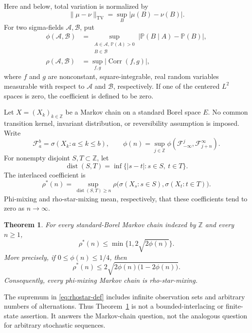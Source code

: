 \documentclass[11pt]{amsart}
\numberwithin{equation}{section}
\newtheorem{theorem}{Theorem}[section]
\theoremstyle{definition}
\newcommand{\PP}{\mathbb P}
\newcommand{\ZZ}{\mathbb Z}
\newcommand{\cF}{\mathcal F}
\newcommand{\TV}{\mathrm{TV}}
\newcommand{\Corr}{\operatorname{Corr}}
\newcommand{\dist}{\operatorname{dist}}
\newcommand{\rhostar}{\rho^{*}}
\begin{document}
Here and below, total variation is normalized by
\begin{equation}\label{eq:tv}
\|\mu-\nu\|_{\TV}=\sup_{B}|\mu(B)-\nu(B)|.
\end{equation}
For two sigma-fields $\mathcal A,\mathcal B$, put
\begin{align}
\phi(\mathcal A,\mathcal B)
 &=\sup_{\substack{A\in\mathcal A,\,\PP(A)>0\\B\in\mathcal B}}
       |\PP(B\mid A)-\PP(B)|,\label{eq:phi-fields}\\
\rho(\mathcal A,\mathcal B)
 &=\sup_{f,g}|\Corr(f,g)|,\label{eq:rho-fields}
\end{align}
where $f$ and $g$ are nonconstant, square-integrable, real random variables measurable with respect to $\mathcal A$ and $\mathcal B$, respectively. If one of the centered $L^2$ spaces is zero, the coefficient is defined to be zero.

Let $X=(X_k)_{k\in\ZZ}$ be a Markov chain on a standard Borel space $E$. No common transition kernel, invariant distribution, or reversibility assumption is imposed. Write
\[
\cF_a^b=\sigma(X_k:a\le k\le b),\qquad
\phi(n)=\sup_{j\in\ZZ}\phi(\cF_{-\infty}^{j},\cF_{j+n}^{\infty}).
\]
For nonempty disjoint $S,T\subset\ZZ$, let
\[
\dist(S,T)=\inf\{|s-t|:s\in S,\ t\in T\}.
\]
The interlaced coefficient is
\begin{equation}\label{eq:rhostar-def}
\rhostar(n)=\sup_{\dist(S,T)\ge n}
\rho\bigl(\sigma(X_s:s\in S),\sigma(X_t:t\in T)\bigr).
\end{equation}
Phi-mixing and rho-star-mixing mean, respectively, that these coefficients tend to zero as $n\to\infty$.

\begin{theorem}\label{thm:main}
For every standard-Borel Markov chain indexed by $\ZZ$ and every $n\ge1$,
\begin{equation}\label{eq:main-simple}
\rhostar(n)\le\min\{1,2\sqrt{2\phi(n)}\}.
\end{equation}
More precisely, if $0\le\phi(n)\le1/4$, then
\begin{equation}\label{eq:main-strong}
\rhostar(n)\le2\sqrt{2\phi(n)\bigl(1-2\phi(n)\bigr)}.
\end{equation}
Consequently, every phi-mixing Markov chain is rho-star-mixing.
\end{theorem}

The supremum in \eqref{eq:rhostar-def} includes infinite observation sets and arbitrary numbers of alternations. Thus Theorem~\ref{thm:main} is not a bounded-interlacing or finite-state assertion. It answers the Markov-chain question, not the analogous question for arbitrary stochastic sequences.
\end{document}
